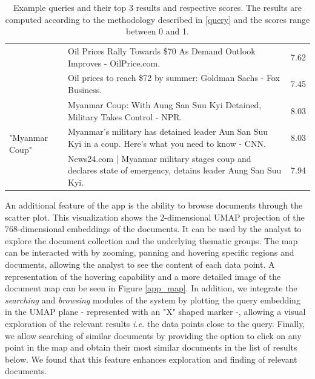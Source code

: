 \documentclass[a4paper]{article}
\begin{document}
\begin{table}[H]
{\begin{tabularx}{\linewidth}{lXl}
                                                & Oil Prices Rally Towards \$70 As Demand Outlook Improves - OilPrice.com.                                       & 7.62            \\
                                                & Oil prices to reach \$72 by summer: Goldman Sachs - Fox Business.                                              & 7.45            \\  \midrule
      \multirow{3}{*}{"Myanmar Coup"}           & Myanmar Coup: With Aung San Suu Kyi Detained, Military Takes Control - NPR.                                    & 8.03            \\
                                                & Myanmar's military has detained leader Aun San Suu Kyi in a coup. Here's what you need to know - CNN.          & 8.03            \\
                                                & News24.com | Myanmar military stages coup and declares state of emergency, detains leader Aung San Suu Kyi.    & 7.94            \\  \bottomrule
    \end{tabularx}%
  }
  \caption{Example queries and their top 3 results and respective scores. The results are computed according to the methodology described in \ref{query} and the scores range between 0 and 1.}
  \label{query_results}
\end{table}

An additional feature of the app is the ability to browse documents through the scatter plot. This visualization shows the 2-dimensional UMAP projection of the 768-dimensional embeddings of the documents. It can be used by the analyst to explore the document collection and the underlying thematic groups. The map can be interacted with by zooming, panning and hovering specific regions and documents, allowing the analyst to see the content of each data point. A representation of the hovering capability and a more detailed image of the document map can be seen in Figure \ref{app_map}. In addition, we integrate the \emph{searching} and \emph{browsing} modules of the system by plotting the query embedding in the UMAP plane - represented with an "X" shaped marker -, allowing a visual exploration of the relevant results \emph{i.e.} the data points close to the query. Finally, we allow searching of similar documents by providing the option to click on any point in the map and obtain their most similar documents in the list of results below. We found that this feature enhances exploration and finding of relevant documents.
\end{document}
